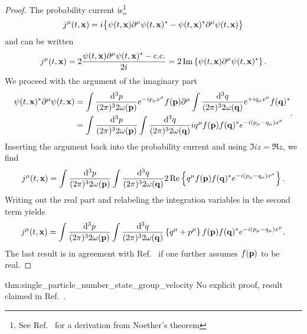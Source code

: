\begin{proof}
	The probability current is\footnote{See Ref.~\cite[p.~18]{Peskin1995} for a derivation from Noether's theorem}
	\begin{equation*}
		j^\mu(t,\vb{x})
		=
		i
		\bigl\{
			\psi(t,\vb{x})
			\partial^\mu
			\psi(t,\vb{x})^*
			-
			\psi(t,\vb{x})^*
			\partial^\mu
			\psi(t,\vb{x})
		\bigr\}
	\end{equation*}
	and can be written
	\begin{equation*}
		j^\mu(t,\vb{x})
		=
		2\frac{\psi(t,\vb{x})\partial^\mu\psi(t,\vb{x})^*-\text{c.c.}}{2i}
		=
		2\operatorname{\operatorname{Im}}\left\{
			\psi(t,\vb{x})
			\partial^\mu
			\psi(t,\vb{x})^*
		\right\}
		.
	\end{equation*}
	We proceed with the argument of the imaginary part
	\begin{equation*}
		\begin{split}
			\psi(t,\vb{x})^*
			\partial^\mu
			\psi(t,\vb{x})
			&=
			\int\frac{\dd[3]{p}}{(2\pi)^32\omega(\vb{p})}
			e^{-ip_\mu x^\mu}
			f(\vb{p})
			\partial^\mu
			\int\frac{\dd[3]{q}}{(2\pi)^32\omega(\vb{q})}
			e^{+iq_\mu x^\mu}
			f(\vb{q})^*
			\\
			&=
			\int\frac{\dd[3]{p}}{(2\pi)^32\omega(\vb{p})}
			\int\frac{\dd[3]{q}}{(2\pi)^32\omega(\vb{q})}
			iq^\mu
			f(\vb{p})
			f(\vb{q})^*
			e^{-i(p_\mu-q_\mu)x^\mu}
		\end{split}
		.
	\end{equation*}
	Inserting the argument back into the probability current and using $\Im{iz}=\Re{z}$, we find
	\begin{equation*}
		j^\mu(t,\vb{x})
		=
		\int\frac{\dd[3]{p}}{(2\pi)^32\omega(\vb{p})}
		\int\frac{\dd[3]{q}}{(2\pi)^32\omega(\vb{q})}
		2\operatorname{\operatorname{Re}}\left\{
			q^\mu
			f(\vb{p})
			f(\vb{q})^*
			e^{-i(p_\mu-q_\mu)x^\mu}
		\right\}
		.
	\end{equation*}
	Writing out the real part and relabeling the integration variables in the second term yields
	\begin{equation*}
		j^\mu(t,\vb{x})
		=
		\int\frac{\dd[3]{p}}{(2\pi)^32\omega(\vb{p})}
		\int\frac{\dd[3]{q}}{(2\pi)^32\omega(\vb{q})}
		\left\{
			q^\mu
			+
			p^\mu
		\right\}
		f(\vb{p})
		f(\vb{q})^*
		e^{-i(p_\mu-q_\mu)x^\mu}
		.
	\end{equation*}	
	The last result is in agreement with Ref.~\cite[eqs.~36,37]{Naumov2013} if one further assumes $f(\vb{p})$ to be real.
\end{proof}
\begin{delayedproof}{thm:single_particle_number_state_group_velocity}
	No explicit proof, result claimed in Ref.~\cite[eq.~38]{Naumov2013}.
\end{delayedproof}
